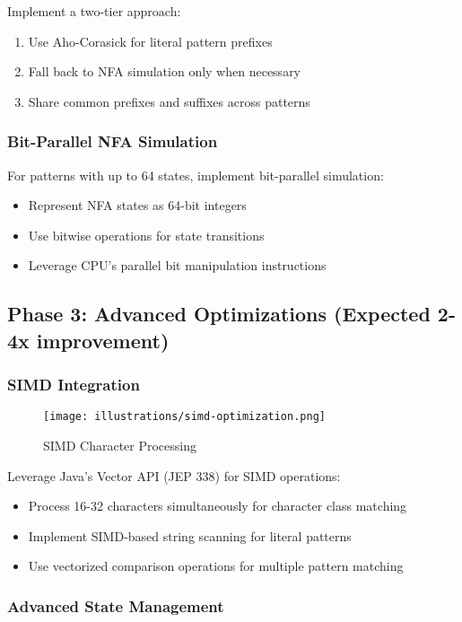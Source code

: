 \documentclass[11pt,a4paper]{article}
\begin{document}
Implement a two-tier approach:
\begin{enumerate}
\item Use Aho-Corasick for literal pattern prefixes
\item Fall back to NFA simulation only when necessary
\item Share common prefixes and suffixes across patterns
\end{enumerate}

\subsubsection{Bit-Parallel NFA Simulation}

For patterns with up to 64 states, implement bit-parallel simulation:
\begin{itemize}
\item Represent NFA states as 64-bit integers
\item Use bitwise operations for state transitions
\item Leverage CPU's parallel bit manipulation instructions
\end{itemize}

\subsection{Phase 3: Advanced Optimizations (Expected 2-4x improvement)}

\subsubsection{SIMD Integration}

\begin{figure}[htbp]
\centering
\texttt{[image: illustrations/simd-optimization.png]}
\caption{SIMD Character Processing}
\label{fig:simd}
\end{figure}

Leverage Java's Vector API (JEP 338) for SIMD operations:
\begin{itemize}
\item Process 16-32 characters simultaneously for character class matching
\item Implement SIMD-based string scanning for literal patterns
\item Use vectorized comparison operations for multiple pattern matching
\end{itemize}

\subsubsection{Advanced State Management}
\end{document}
